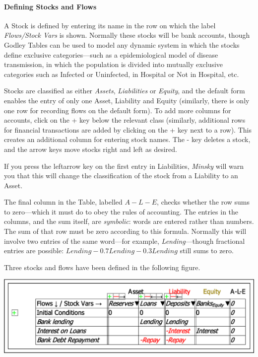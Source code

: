 \paragraph{Defining Stocks and Flows}

A Stock is defined by entering its name in the row on which the label
\emph{Flows\textdownarrow /Stock Vars\textrightarrow{}} is shown.
Normally these stocks will be bank accounts, though Godley Tables
can be used to model any dynamic system in which the stocks define
exclusive categories---such as a epidemiological model of disease
transmission, in which the population is divided into mutually exclusive
categories such as Infected or Uninfected, in Hospital or Not in Hospital,
etc.

Stocks are classified as either \emph{Assets}, \emph{Liabilities }or
\emph{Equity}, and the default form enables the entry of only one
Asset, Liability and Equity (similarly, there is only one row for
recording flows on the default form). To add more columns for accounts,
click on the + key below the relevant class (similarly, additional
rows for financial transactions are added by clicking on the + key
next to a row). This creates an additional column for entering stock
names. The - key deletes a stock, and the arrow keys move stocks right
and left as desired. 

If you press the leftarrow key on the first entry in Liabilities,
\emph{Minsky} will warn you that this will change the classification
of the stock from a Liability to an Asset.

The final column in the Table, labelled $A-L-E$, checks whether the
row sums to zero---which it must do to obey the rules of accounting.
The entries in the columns, and the sum itself, are \emph{symbolic}:
words are entered rather than numbers. The sum of that row must be
zero according to this formula. Normally this will involve two entries
of the same word---for example, \emph{Lending}---though fractional
entries are possible: $Lending-0.7Lending-0.3Lending$ still sums
to zero.

Three stocks and flows have been defined in the following figure. 

\noindent\includegraphics[width=\textwidth]{images/GodleyTableEditMode3StocksAndFlows}

